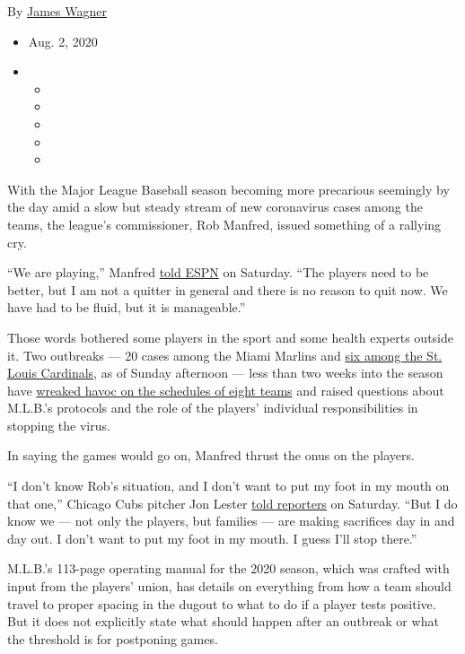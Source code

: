 By \href{https://www.nytimes3xbfgragh.onion/by/james-wagner}{James
Wagner}

\begin{itemize}
\item
  Aug. 2, 2020
\item
  \begin{itemize}
  \item
  \item
  \item
  \item
  \item
  \end{itemize}
\end{itemize}

With the Major League Baseball season becoming more precarious seemingly
by the day amid a slow but steady stream of new coronavirus cases among
the teams, the league's commissioner, Rob Manfred, issued something of a
rallying cry.

``We are playing,'' Manfred
\href{https://twitter.com/karlravechespn/status/1289628827157581830}{told
ESPN} on Saturday. ``The players need to be better, but I am not a
quitter in general and there is no reason to quit now. We have had to be
fluid, but it is manageable.''

Those words bothered some players in the sport and some health experts
outside it. Two outbreaks --- 20 cases among the Miami Marlins and
\href{https://www.nytimes3xbfgragh.onion/2020/08/01/sports/baseball/coronavirus-cardinals.html}{six
among the St. Louis Cardinals}, as of Sunday afternoon --- less than two
weeks into the season have
\href{https://www.nytimes3xbfgragh.onion/2020/07/30/sports/baseball/phillies-blue-jays-postponed-coronavirus.html}{wreaked
havoc on the schedules of eight teams} and raised questions about
M.L.B.'s protocols and the role of the players' individual
responsibilities in stopping the virus.

In saying the games would go on, Manfred thrust the onus on the players.

``I don't know Rob's situation, and I don't want to put my foot in my
mouth on that one,'' Chicago Cubs pitcher Jon Lester
\href{https://theathletic.com/1968292/2020/08/02/at-a-time-like-this-jon-lester-isnt-going-to-blame-or-second-guess-the-players/}{told
reporters} on Saturday. ``But I do know we --- not only the players, but
families --- are making sacrifices day in and day out. I don't want to
put my foot in my mouth. I guess I'll stop there.''

M.L.B.'s 113-page operating manual for the 2020 season, which was
crafted with input from the players' union, has details on everything
from how a team should travel to proper spacing in the dugout to what to
do if a player tests positive. But it does not explicitly state what
should happen after an outbreak or what the threshold is for postponing
games.

